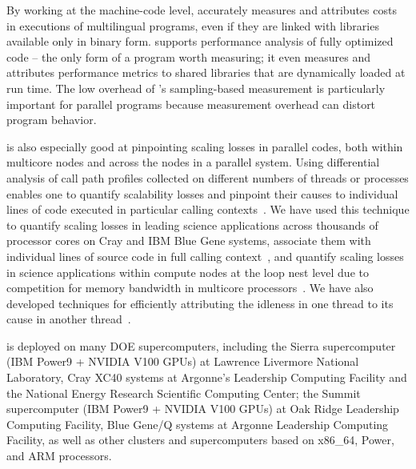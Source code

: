 \documentclass[11pt,letterpaper]{report}
\begin{document}
By working at the machine-code level, \HPCToolkit{} accurately measures and attributes costs in executions of multilingual programs, even if they are linked with libraries available only in binary form.
\HPCToolkit{} supports performance analysis of fully optimized code -- the only form of a program worth measuring; it even measures and attributes performance metrics to shared libraries that are dynamically loaded at run time.
The low overhead of \HPCToolkit{}'s sampling-based measurement is particularly important for parallel programs because measurement overhead can distort program behavior.

\HPCToolkit{} is also especially good at pinpointing scaling losses in parallel codes, both within multicore nodes and across the nodes in a parallel system.
Using differential analysis of call path profiles collected on different numbers of threads or processes enables one to quantify scalability losses and pinpoint their causes to individual lines of code executed in particular calling contexts~\cite{Coarfa-MC:2007:ICS-scalability}.
We have used this technique to quantify scaling losses in leading science applications across thousands of processor cores on Cray and IBM Blue Gene systems, associate them with individual lines of source code in full calling context~\cite{Tallent-MC-etal:2009:SC-hpctoolkit-petascale,Tallent-MC-etal:2010:SC-hpctoolkit-load-imbalance}, and quantify scaling losses in science applications within compute nodes at the loop nest level due to competition for memory bandwidth in multicore processors~\cite{Tallent-etal:2008:SciDAC-hpctoolkit}.
We have also developed techniques for efficiently attributing the idleness in one thread to its cause in another thread~\cite{Tallent-MC:2009:PPoPP-hpctoolkit-work-stealing,Tallent-MC-Porterfield:2010:PPoPP-hpctoolkit-lock-contention}.

\HPCToolkit{} is deployed on many DOE supercomputers, including 
the Sierra supercomputer (IBM Power9 + NVIDIA V100 GPUs) at Lawrence Livermore National Laboratory,
Cray XC40 systems at Argonne's Leadership Computing Facility and the National Energy
Research Scientific Computing Center; the Summit supercomputer (IBM Power9 + NVIDIA V100 GPUs) at Oak Ridge Leadership Computing Facility, 
Blue Gene/Q systems at Argonne Leadership Computing Facility, 
as well as other clusters and supercomputers based on x86\_64, Power, and ARM processors. 

\end{document}
